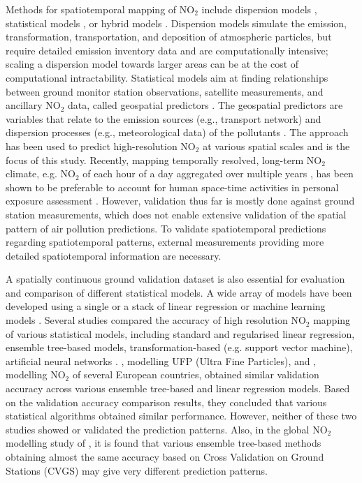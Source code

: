 \documentclass{article}
\begin{document}
Methods for spatiotemporal mapping of NO$_2$ include dispersion models \citep{holmes2006review, health2010traffic}, statistical models \citep{chen2019comparison}, or hybrid models \citep{molter2010modelling,marshall2008within,beelen2010comparison,dijkema2010comparison, akita2014large}. Dispersion models simulate the emission, transformation, transportation, and deposition of atmospheric particles, but require detailed emission inventory data and are computationally intensive; scaling a dispersion model towards larger areas can be at the cost of computational intractability. Statistical models aim at finding relationships between ground monitor station observations, satellite measurements, and ancillary NO$_2$ data, called geospatial predictors \citep{rivera2013nitrogen, park2017individual,kharol2015assessment, isiugo2018assessing, chen2019comparison,luglobal}. The geospatial predictors are variables that relate to the emission sources (e.g., transport network) and dispersion processes (e.g., meteorological data) of the pollutants \citep{briggs2000regression}. The approach has been used to predict high-resolution NO$_2$ at various spatial scales \citep{Hoek2008,larkin2017global} and is the focus of this study.  Recently, mapping temporally resolved, long-term NO$_2$ climate, e.g. NO$_2$ of each hour of a day aggregated over multiple years \citep{lu2020land}, has been shown to be preferable to account for human space-time activities in personal exposure assessment \citep{lu2019}. However, validation thus far is mostly done against ground station measurements, which does not enable extensive validation of the spatial pattern of air pollution predictions. To validate spatiotemporal predictions regarding spatiotemporal patterns, external measurements providing more detailed spatiotemporal information are necessary.

A spatially continuous ground validation dataset is also essential for evaluation and comparison of different statistical models. A wide array of models have been developed using a single or a stack of linear regression \citep{briggs2000regression} or machine learning models \citep{kees2020satelliteML}. Several studies compared the accuracy of high resolution NO$_2$ mapping of various statistical models, including standard and regularised linear regression, ensemble tree-based models, transformation-based (e.g. support vector machine), artificial neural networks \citep{chen2019comparison, kerckhoffs2019performance, luglobal}. \cite{kerckhoffs2019performance}, modelling UFP (Ultra Fine Particles), and \cite{chen2019comparison}, modelling NO$_2$ of several European countries, obtained similar validation accuracy across various ensemble tree-based and linear regression models. Based on the validation accuracy comparison results, they concluded that various statistical algorithms obtained similar performance. However, neither of these two studies showed or validated the prediction patterns. Also, in the global NO$_2$ modelling study of \cite{luglobal}, it is found that various ensemble tree-based methods obtaining almost the same accuracy based on Cross Validation on Ground Stations (CVGS) may give very different prediction patterns.  
\end{document}
